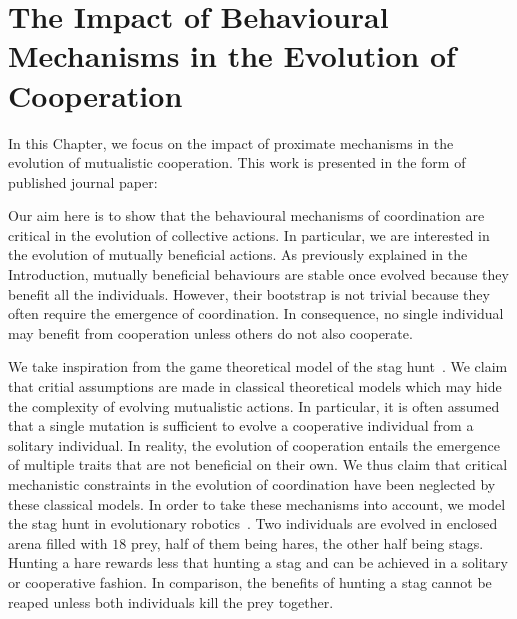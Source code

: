 \chapter{The Impact of Behavioural Mechanisms in the Evolution of Cooperation}
\label{chapter:C1_article1}

\setcounter{secnumdepth}{0}
\setcounter{minitocdepth}{1}
\minitoc[n] %

In this Chapter, we focus on the impact of proximate mechanisms in the evolution of mutualistic cooperation. This work is presented in the form of published journal paper:

\begin{quote}
\end{quote}

Our aim here is to show that the behavioural mechanisms of coordination are critical in the evolution of collective actions. In particular, we are interested in the evolution of mutually beneficial actions. As previously explained in the Introduction, mutually beneficial behaviours are stable once evolved because they benefit all the individuals. However, their bootstrap is not trivial because they often require the emergence of coordination. In consequence, no single individual may benefit from cooperation unless others do not also cooperate.

We take inspiration from the game theoretical model of the stag hunt~\parencite{Skyrms2004}. We claim that critial assumptions are made in classical theoretical models which may hide the complexity of evolving mutualistic actions. In particular, it is often assumed that a single mutation is sufficient to evolve a cooperative individual from a solitary individual. In reality, the evolution of cooperation entails the emergence of multiple traits that are not beneficial on their own. We thus claim that critical mechanistic constraints in the evolution of coordination have been neglected by these classical models. In order to take these mechanisms into account, we model the stag hunt in evolutionary robotics~\parencite{Nolfi2000, Doncieux2015a}. Two individuals are evolved in enclosed arena filled with $18$ prey, half of them being hares, the other half being stags. Hunting a hare rewards less that hunting a stag and can be achieved in a solitary or cooperative fashion. In comparison, the benefits of hunting a stag cannot be reaped unless both individuals kill the prey together.

